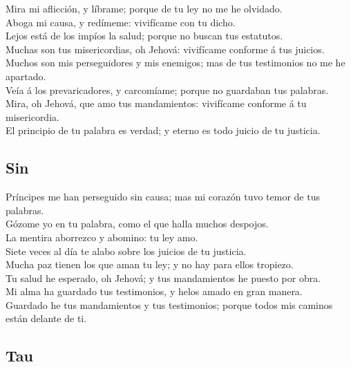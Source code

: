  Mira mi aflicción, y líbrame; porque de tu ley no me he
olvidado.\\
 Aboga mi causa, y redímeme: vivifícame con tu dicho.\\
 Lejos está de los impíos la salud; porque no buscan tus
estatutos.\\
 Muchas son tus misericordias, oh Jehová: vivifícame
conforme á tus juicios.\\
 Muchos son mis perseguidores y mis enemigos; mas de tus
testimonios no me he apartado.\\
 Veía á los prevaricadores, y carcomíame; porque no
guardaban tus palabras.\\
 Mira, oh Jehová, que amo tus mandamientos: vivifícame
conforme á tu misericordia.\\
 El principio de tu palabra es verdad; y eterno es todo
juicio de tu justicia.

\hypertarget{sin}{%
\subsection{Sin}\label{sin}}

 Príncipes me han perseguido sin causa; mas mi corazón
tuvo temor de tus palabras.\\
 Gózome yo en tu palabra, como el que halla muchos
despojos.\\
 La mentira aborrezco y abomino: tu ley amo.\\
 Siete veces al día te alabo sobre los juicios de tu
justicia.\\
 Mucha paz tienen los que aman tu ley; y no hay para ellos
tropiezo.\\
 Tu salud he esperado, oh Jehová; y tus mandamientos he
puesto por obra.\\
 Mi alma ha guardado tus testimonios, y helos amado en
gran manera.\\
 Guardado he tus mandamientos y tus testimonios; porque
todos mis caminos están delante de ti.

\hypertarget{tau}{%
\subsection{Tau}\label{tau}}

